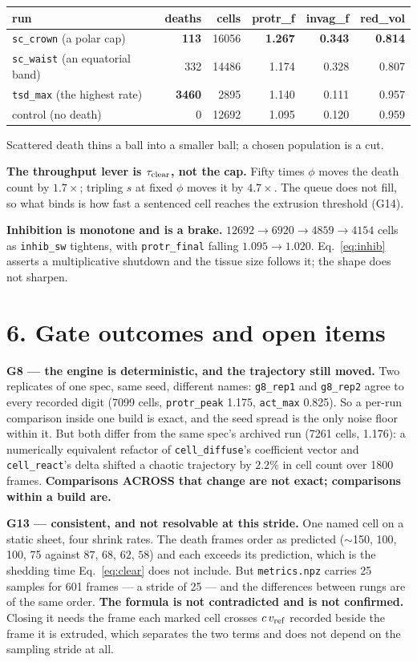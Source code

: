 \documentclass[10pt,a4paper]{article}
\newcommand{\code}[1]{\texttt{#1}}
\newcommand{\op}[1]{\texttt{#1}}
\begin{document}
\smallskip
{\small\begin{tabular}{@{}lrrrrr@{}}\toprule
run & deaths & cells & protr\_f & invag\_f & red\_vol\\\midrule
\op{sc\_crown} (a polar cap)      & \textbf{113} & 16056 & \textbf{1.267} & \textbf{0.343} & \textbf{0.814}\\
\op{sc\_waist} (an equatorial band)&  332 & 14486 & 1.174 & 0.328 & 0.807\\
\op{tsd\_max} (the highest rate)   & \textbf{3460} &  2895 & 1.140 & 0.111 & 0.957\\
control (no death)                 &    0 & 12692 & 1.095 & 0.120 & 0.959\\
\bottomrule\end{tabular}}
\smallskip

Scattered death thins a ball into a smaller ball; a chosen population is a cut.

\textbf{The throughput lever is $\tau_{\rm clear}$, not the cap.} Fifty times $\phi$ moves the death
count by $1.7\times$; tripling $s$ at fixed $\phi$ moves it by $4.7\times$. The queue does not fill,
so what binds is how fast a sentenced cell reaches the extrusion threshold (G14).

\textbf{Inhibition is monotone and is a brake.} $12692 \to 6920 \to 4859 \to 4154$ cells as
\code{inhib\_sw} tightens, with \code{protr\_final} falling $1.095 \to 1.020$. Eq.~\eqref{eq:inhib}
asserts a multiplicative shutdown and the tissue size follows it; the shape does not sharpen.

\section*{6.\; Gate outcomes and open items}

\textbf{G8 --- the engine is deterministic, and the trajectory still moved.} Two replicates of one
spec, same seed, different names: \op{g8\_rep1} and \op{g8\_rep2} agree to every recorded digit
(7099 cells, \code{protr\_peak} 1.175, \code{act\_max} 0.825). So a per-run comparison inside one
build is exact, and the seed spread is the only noise floor within it. But both differ from the
same spec's archived run (7261 cells, 1.176): a numerically equivalent refactor of
\op{cell\_diffuse}'s coefficient vector and \op{cell\_react}'s delta shifted a chaotic trajectory
by $2.2\%$ in cell count over 1800 frames. \textbf{Comparisons ACROSS that change are not exact;
comparisons within a build are.}

\textbf{G13 --- consistent, and not resolvable at this stride.} One named cell on a static sheet,
four shrink rates. The death frames order as predicted ($\sim$150, 100, 100, 75 against $87$, $68$,
$62$, $58$) and each exceeds its prediction, which is the shedding time
Eq.~\eqref{eq:clear} does not include. But \code{metrics.npz} carries 25 samples for 601 frames --- a
stride of 25 --- and the differences between rungs are of the same order. \textbf{The formula is not
contradicted and is not confirmed.} Closing it needs the frame each marked cell crosses
$c\,v_{\rm ref}$ recorded beside the frame it is extruded, which separates the two terms and does
not depend on the sampling stride at all.
\end{document}
